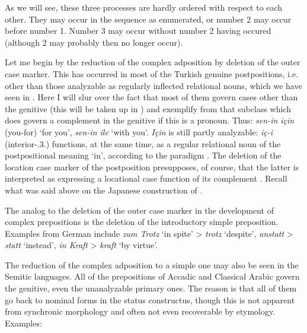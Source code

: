 As we will see, these three processes are hardly ordered with respect to each other. They may occur in the sequence as enumerated, or number 2 may occur before number 1. Number 3 may occur without number 2 having occured (although 2 may probably then no longer occur).

\label{page86}Let me begin by the reduction of the complex adposition by deletion of the outer case marker. This has occurred in most of the Turkish genuine postpositions, i.e. other than those analyzable as regularly inflected relational nouns, which we have seen in . Here I will slur over the fact that most of them govern cases other than the genitive (this will be taken up in ) and exemplify from that subclass which does govern a complement in the genitive if this is a pronoun. Thus: \textit{sen-in için} (you-\gen for) ‘for you’, \textit{sen-in ile} ‘with you’. \textit{Için} is still partly analyzable: \textit{iç-i} (interior-\glposs.3.\glsg) functions, at the same time, as a regular relational noun of the postpositional meaning ‘in’, according to the paradigm . The deletion of the location case marker of the postposition presupposes, of course, that the latter is interpreted as expressing a locational case function of its complement \np. Recall what was said above on the Japanese construction of .

The analog to the deletion of the outer case marker in the development of complex prepositions is the deletion of the introductory simple preposition. Examples from German include \textit{zum Trotz} %
 ‘in spite’ {\textgreater} \textit{trotz} ‘despite’, \textit{anstatt} {\textgreater} \textit{statt} ‘instead’, \textit{in Kraft} {\textgreater} \textit{kraft} ‘by virtue’.

The reduction of the complex adposition to a simple one may also be seen in the Semitic languages. All of the prepositions of Accadic and Classical Arabic govern the genitive, even the unanalyzable primary ones. The reason is that all of them go back to nominal forms in the status constructus, though this is not apparent from synchronic morphology and often not even recoverable by etymology. Examples:

